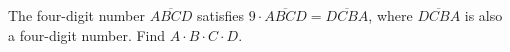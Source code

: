 The four-digit number $\overline{ABCD}$ satisfies $9\cdot\overline{ABCD}=\overline{DCBA}$, where $\overline{DCBA}$ is also a four-digit number. Find $A\cdot B\cdot C\cdot D$.
